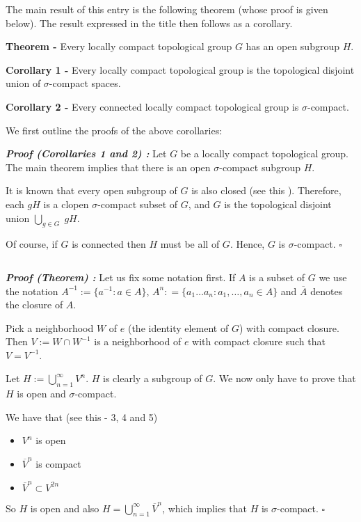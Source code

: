 \documentclass[12pt]{article}
\begin{document}
The main result of this entry is the following theorem (whose proof is given below). The result expressed in the title then follows as a corollary.

{\bf Theorem -} Every locally compact topological group $G$ has an open  subgroup $H$.

{\bf Corollary 1 -} Every locally compact topological group is the topological disjoint union of $\sigma$-compact spaces.

{\bf Corollary 2 -} Every connected locally compact topological group is $\sigma$-compact.

We first outline the proofs of the above corollaries:

{\bf \textit{Proof (Corollaries 1 and 2) :}} Let $G$ be a locally compact topological group. The main theorem implies that there is an open $\sigma$-compact subgroup $H$. 

It is known that every open subgroup of $G$ is also closed (see this ). Therefore, each $gH$ is a clopen $\sigma$-compact subset of $G$, and $G$ is the topological disjoint union $\displaystyle \bigcup_{g \in G}\; gH$.

Of course, if $G$ is connected then $H$ must be all of $G$. Hence, $G$ is $\sigma$-compact. $\square$

$\quad$

{\bf \textit{Proof (Theorem) :}} Let us fix some notation first. If $A$ is a subset of $G$ we use the notation $A^{-1} := \{ a^{-1} : a \in A\}$,  $A^n : = \{ a_1\dots a_n : a_1, \dots, a_n \in A\}$ and $\overline{A}$ denotes the closure of $A$.

Pick a neighborhood $W$ of $e$ (the identity element of $G$) with compact closure. Then $V:= W \cap W^{-1}$ is a neighborhood of $e$ with compact closure such that $V = V^{-1}$.

Let $ H := \bigcup_{n =1}^{\infty} V^n$. $H$ is clearly a subgroup of $G$. We now only have to prove that $H$ is open and $\sigma$-compact.

We have that (see this  -  3, 4 and 5)
\begin{itemize}
\item $V^n$ is open
\item $\overline{V}^n$ is compact
\item $\overline{V}^n \subset V^{2n}$
\end{itemize}

So $H$ is open and also $ H = \bigcup_{n =1}^{\infty} \overline{V}^n$, which implies that $H$ is $\sigma$-compact. $\square$
\end{document}
